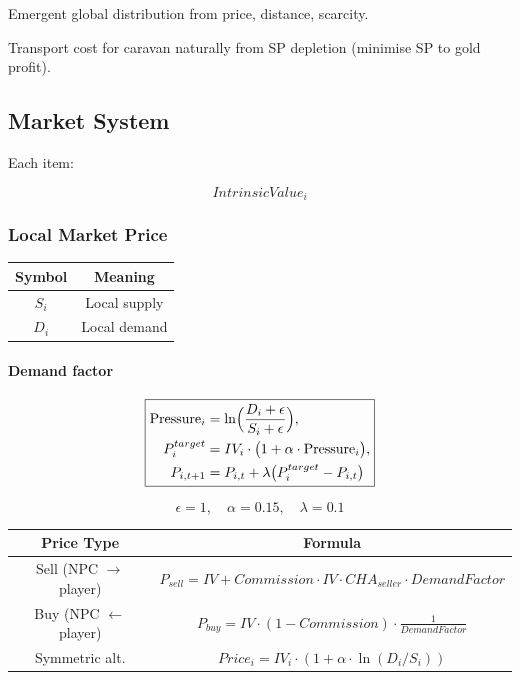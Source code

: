 \documentclass[a4paper,12pt]{article}
\begin{document}
Emergent global distribution from price, distance, scarcity.

Transport cost for caravan naturally from SP depletion (minimise SP to gold profit).



\subsection{Market System}

Each item:

\begin{equation}
IntrinsicValue_i
\end{equation}



\subsubsection{Local Market Price}

\begin{table}[H]
\centering
\begin{tabular}{|c|c|}
\hline
Symbol & Meaning \\
\hline
$S_i$ & Local supply \\
$D_i$ & Local demand \\
\hline
\end{tabular}
\end{table}

\paragraph{Demand factor}

\[
\boxed{
\begin{aligned}
\text{Pressure}_i &= 
\ln\Bigl(\frac{D_i + \epsilon}{S_i + \epsilon}\Bigr), \\
P^{target}_i &= 
IV_i \cdot \bigl(1 + \alpha \cdot \text{Pressure}_i \bigr), \\
P_{i,t+1} &= 
P_{i,t} + \lambda \bigl(P^{target}_i - P_{i,t}\bigr)
\end{aligned}
}
\]

\[
\epsilon = 1, \quad \alpha = 0.15, \quad \lambda = 0.1
\]



\begin{table}[H]
\centering
\begin{tabular}{|c|c|}
\hline
Price Type & Formula \\
\hline
Sell (NPC $\rightarrow$ player) & 
$P_{sell} = IV + Commission \cdot IV \cdot CHA_{seller} \cdot DemandFactor$ \\

Buy (NPC $\leftarrow$ player) &
$P_{buy} = IV \cdot (1 - Commission) \cdot \frac{1}{DemandFactor}$ \\

Symmetric alt. &
$Price_i = IV_i \cdot (1 + \alpha \cdot \ln(D_i / S_i))$ \\
\hline
\end{tabular}
\end{table}
\end{document}

